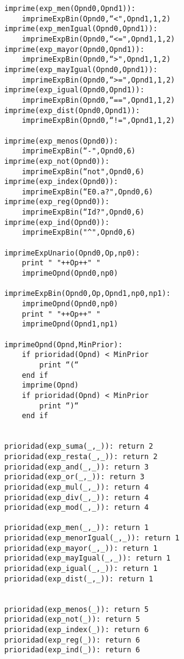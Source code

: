\begin{lstlisting}
imprime(exp_men(Opnd0,Opnd1)):
    imprimeExpBin(Opnd0,“<",Opnd1,1,2)
imprime(exp_menIgual(Opnd0,Opnd1)):
    imprimeExpBin(Opnd0,“<=",Opnd1,1,2)
imprime(exp_mayor(Opnd0,Opnd1)):
    imprimeExpBin(Opnd0,“>",Opnd1,1,2)
imprime(exp_mayIgual(Opnd0,Opnd1)):
    imprimeExpBin(Opnd0,“>=",Opnd1,1,2)
imprime(exp_igual(Opnd0,Opnd1)):
    imprimeExpBin(Opnd0,“==",Opnd1,1,2)
imprime(exp_dist(Opnd0,Opnd1)):
    imprimeExpBin(Opnd0,“!=",Opnd1,1,2)

imprime(exp_menos(Opnd0)):
    imprimeExpBin(“-",Opnd0,6)
imprime(exp_not(Opnd0)):
    imprimeExpBin(“not",Opnd0,6)
imprime(exp_index(Opnd0)):
    imprimeExpBin(“E0.a?",Opnd0,6)
imprime(exp_reg(Opnd0)):
    imprimeExpBin(“Id?",Opnd0,6)
imprime(exp_ind(Opnd0)):
    imprimeExpBin("^",Opnd0,6)

imprimeExpUnario(Opnd0,Op,np0):
    print " "++Op++" "
    imprimeOpnd(Opnd0,np0)
       
imprimeExpBin(Opnd0,Op,Opnd1,np0,np1):
    imprimeOpnd(Opnd0,np0)
    print " "++Op++" "
    imprimeOpnd(Opnd1,np1)
    
imprimeOpnd(Opnd,MinPrior):
    if prioridad(Opnd) < MinPrior
        print “(“
    end if
    imprime(Opnd)
    if prioridad(Opnd) < MinPrior
        print “)“
    end if    


prioridad(exp_suma(_,_)): return 2
prioridad(exp_resta(_,_)): return 2
prioridad(exp_and(_,_)): return 3
prioridad(exp_or(_,_)): return 3
prioridad(exp_mul(_,_)): return 4
prioridad(exp_div(_,_)): return 4
prioridad(exp_mod(_,_)): return 4

prioridad(exp_men(_,_)): return 1
prioridad(exp_menorIgual(_,_)): return 1
prioridad(exp_mayor(_,_)): return 1
prioridad(exp_mayIgual(_,_)): return 1
prioridad(exp_igual(_,_)): return 1
prioridad(exp_dist(_,_)): return 1


prioridad(exp_menos(_)): return 5
prioridad(exp_not(_)): return 5
prioridad(exp_index(_)): return 6
prioridad(exp_reg(_)): return 6
prioridad(exp_ind(_)): return 6




\end{lstlisting}